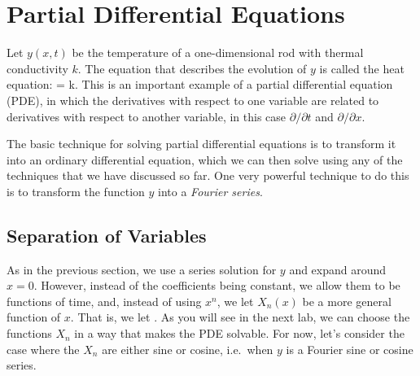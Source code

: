 \documentclass[12pt]{book}
\begin{document}
\chapter{Partial Differential Equations}
Let $y(x,t)$ be the temperature of a one-dimensional rod with thermal
conductivity $k$. The equation that describes the evolution of $y$ is
called the heat equation:
\bee
{} =  k.
\eee
This is an important example of a partial differential equation (PDE), in which
the derivatives with respect to one variable are related to derivatives with
respect to another variable, in this case $\partial/\partial t$ and
$\partial/\partial x$.

The basic technique for solving partial differential equations is to transform
it into an ordinary differential equation, which we can then solve using any
of the techniques that we have discussed so far. One very powerful technique
to do this is to transform the function $y$ into a \emph{Fourier series}.

\section{Separation of Variables}
As in the previous section, we use a series solution for $y$ and expand around
 $x=0$. However, instead of the coefficients being constant, we allow them to
be functions of time, and, instead of using $x^n$, we let $X_n(x)$ be a more
general function of $x$. That is, we let
\be
{}.
\ee
As you will see in the next lab, we can choose the functions $X_n$ in a way
that makes the PDE solvable. For now, let's consider the case where the $X_n$
are either sine or cosine, i.e.\ when $y$ is a Fourier sine or cosine series.
\end{document}
